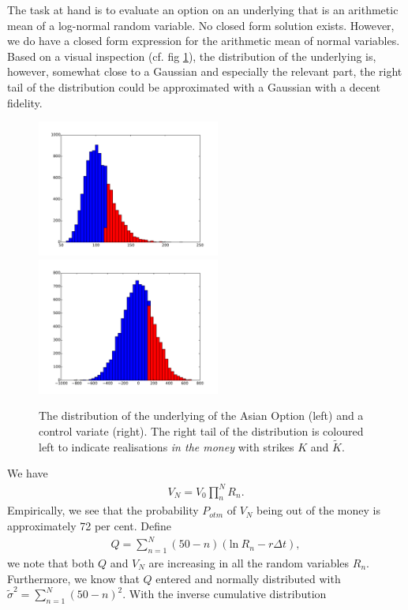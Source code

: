 \documentclass[a4paper,11pt]{article}
\newcommand{\parent}[1]{\left( {#1} \right)}
\newcommand{\ssum}[2]{\displaystyle\sum\limits_{#1}^{#2}}
\newcommand{\pprod}[2]{\displaystyle\prod\limits_{#1}^{#2}}
\begin{document}
The task at hand is to evaluate an option on an underlying that is an arithmetic
mean of a log-normal random variable. No closed form solution exists. However,
we do have a closed form expression for the arithmetic mean of normal variables.
Based on a visual inspection (cf. fig \ref{fig:loghist}), the distribution of the underlying is, however, somewhat
close to a Gaussian and especially the relevant part, the right tail of the distribution could 
be approximated with a Gaussian with a decent fidelity.
\begin{figure}
\begin{center}
\includegraphics[width=60mm]{./v_n_histogram.pdf}
\includegraphics[width=60mm]{./v_n_histogram_cv.pdf}
\end{center}
\caption{
\label{fig:loghist}
The distribution of the underlying of the Asian Option (left)
and a control variate (right). The right tail of the distribution is
coloured left to indicate
realisations \emph{in the money} with strikes $K$  and $\tilde K$.
}
\end{figure}
We have
\begin{align}
V_N=V_0 \pprod{n}{N} R_n.
\end{align}
Empirically, we see that the probability $P_{otm}$ of $V_N$ being out of the money is
approximately 72 per cent.
Define
\begin{align}
Q = \ssum{n=1}{N} \parent{50-n} \parent{\mathrm{ln}~R_n - r \Delta t},
\end{align}
we note that both $Q$ and $V_N$ are increasing in all the random variables
$R_n$. Furthermore, we know that $Q$ entered and normally distributed with
$\tilde \sigma^2 = \ssum{n=1}{N} \parent{50-n}^2$. With the inverse cumulative distribution
\end{document}
